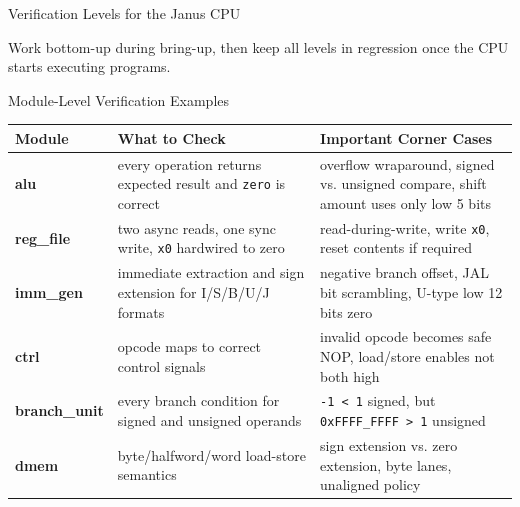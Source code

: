 \documentclass[aspectratio=169,10pt]{beamer}
\begin{document}
\begin{frame}{Verification Levels for the Janus CPU}
  \begin{center}
  \end{center}

  \vspace{0.5em}
  \small
  Work bottom-up during bring-up, then keep all levels in regression once the CPU starts executing programs.
\end{frame}

\begin{frame}{Module-Level Verification Examples}
  \renewcommand{\arraystretch}{1.2}
  \small
  \begin{tabular}{>{\bfseries\ttfamily}l p{4.5cm} p{5.8cm}}
    \toprule
    Module & What to Check & Important Corner Cases \\
    \midrule
    alu & every operation returns expected result and \texttt{zero} is correct & overflow wraparound, signed vs. unsigned compare, shift amount uses only low 5 bits \\
    \rowcolor{black!5}
    reg\_file & two async reads, one sync write, \texttt{x0} hardwired to zero & read-during-write, write \texttt{x0}, reset contents if required \\
    imm\_gen & immediate extraction and sign extension for I/S/B/U/J formats & negative branch offset, JAL bit scrambling, U-type low 12 bits zero \\
    \rowcolor{black!5}
    ctrl & opcode maps to correct control signals & invalid opcode becomes safe NOP, load/store enables not both high \\
    branch\_unit & every branch condition for signed and unsigned operands & \texttt{-1 < 1} signed, but \texttt{0xFFFF\_FFFF > 1} unsigned \\
    \rowcolor{black!5}
    dmem & byte/halfword/word load-store semantics & sign extension vs. zero extension, byte lanes, unaligned policy \\
    \bottomrule
  \end{tabular}
\end{frame}
\end{document}
